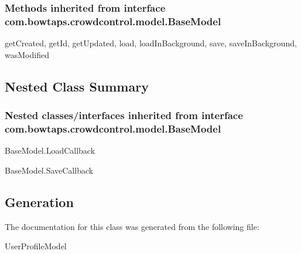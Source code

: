 \subsubsection{Methods inherited from interface com.bowtaps.crowdcontrol.model.BaseModel}

getCreated, getId, getUpdated, load, loadInBackground, save, saveInBackground, wasModified\\



\subsection{Nested Class Summary}

\subsubsection{Nested classes/interfaces inherited from interface com.bowtaps.crowdcontrol.model.BaseModel}
\begin{DoxyCompactItemize}
\item  \hypertarget{class_BaseModel.Android.LoadCallBack}{BaseModel.LoadCallback}
\item  \hypertarget{class_BaseModel.Android.SaveCallback}{BaseModel.SaveCallback}
\end{DoxyCompactItemize} 



\subsection{Generation}
The documentation for this class was generated from the following file\-:
\begin{DoxyCompactItemize}
\item UserProfileModel
\end{DoxyCompactItemize} 









